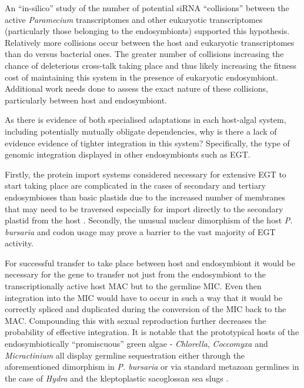 An ``in-silico'' study of the number of potential siRNA ``collisions''
between the active \textit{Paramecium} transcriptomes and other
eukaryotic transcriptomes (particularly those belonging to the endosymbionts) 
supported this hypothesis.  Relatively more collisions occur between
the host and eukaryotic transcriptomes than do versus bacterial ones.
The greater number of collisions increasing the chance of deleterious
cross-talk taking place and thus likely increasing the fitness
cost of maintaining this system in the presence of eukaryotic endosymbiont. 
Additional work needs done to assess the exact nature of these collisions,
particularly between host and endosymbiont. 



As there is evidence of both specialised adaptations in each
host-algal system, including potentially mutually obligate dependencies,
why is there a lack of evidence evidence of tighter 
integration in this system?  Specifically, the type of genomic
integration displayed in other endosymbionts such as EGT.

Firstly, the protein import systems considered necessary for extensive
EGT to start taking place are complicated
in the cases of secondary and tertiary endosymbioses
than basic plastids due to the increased number
of membranes that may need to be traversed especially
for import directly to the secondary plastid from the
host \citep{Hirakawa2012}.
Secondly, the unusual nuclear dimorphism of the host \textit{P. bursaria}
and codon usage may prove a barrier to the vast majority of EGT activity. 

For successful transfer to take place between host and endosymbiont it
would be necessary for the gene to transfer not just from the 
endosymbiont to the transcriptionally active host MAC but to the germline
MIC.  Even then integration into the MIC would have to occur in such a way
that it would be correctly spliced and duplicated during the conversion of the MIC
back to the MAC.
Compounding this with sexual reproduction further decreases the probability of
effective integration.
It is notable that the prototypical hosts of the endosymbiotically ``promiscuous''
green algae - \textit{Chlorella}, \textit{Coccomyxa} and \textit{Micractinium} 
all display germline sequestration either through the aforementioned dimorphism
in \textit{P. bursaria} or via standard metazoan germlines in the case of
\textit{Hydra} \citep{Kawaida2013} and the kleptoplastic sacoglossan sea slugs \citep{Yellowlees2008}.



